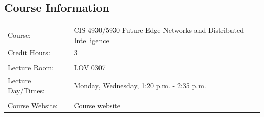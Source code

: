 

\subsection*{Course Information}


\vspace{0ex}%
  \noindent\parbox{0.98\textwidth}{%
  \noindent\begin{tabular}{@{}p{}p{}@{}}

\textsf{Course:}          & 	CIS 4930/5930 Future Edge Networks and Distributed Intelligence\\
\textsf{Credit Hours:}    & 	3   \\
\\
\textsf{Lecture Room:}            & 	LOV 0307  \\
\textsf{Lecture Day/Times:}       & 	Monday, Wednesday, 1:20 p.m. - 2:35 p.m.\\
\\
\textsf{Course Website:} &  \href{https://xinliulab.github.io/FSU-CIS4930-CIS5930-Future-Edge-Networks/}{Course website}\\
 
\end{tabular}}

